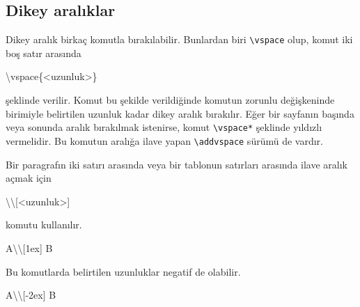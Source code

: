 \documentclass[
  10pt,
]{scrbook}
\newenvironment{Shaded}{\begin{snugshade}}{\end{snugshade}}
\newcommand{\FunctionTok}[1]{\textcolor[rgb]{0.00,0.00,0.00}{#1}}
\newcommand{\NormalTok}[1]{#1}
\theoremstyle{definition}
\theoremstyle{definition}
\theoremstyle{definition}
\theoremstyle{definition}
\theoremstyle{remark}
\begin{document}
\hypertarget{dikey-aralux131klar}{%
\subsection{Dikey aralıklar}\label{dikey-aralux131klar}}

Dikey aralık birkaç komutla bırakılabilir. Bunlardan biri \texttt{\textbackslash{}vspace} olup, komut iki boş satır arasında

\begin{Shaded}
\begin{Highlighting}[]
\FunctionTok{\textbackslash{}vspace}\NormalTok{\{\textless{}uzunluk\textgreater{}\}}
\end{Highlighting}
\end{Shaded}

şeklinde verilir. Komut bu şekilde verildiğinde komutun zorunlu değişkeninde birimiyle belirtilen uzunluk kadar dikey aralık bırakılır. Eğer bir sayfanın başında veya sonunda aralık bırakılmak istenirse, komut \texttt{\textbackslash{}vspace*} şeklinde yıldızlı vermelidir. Bu komutun aralığa ilave yapan \texttt{\textbackslash{}addvspace} sürümü de vardır.

Bir paragrafın iki satırı arasında veya bir tablonun satırları arasında ilave aralık açmak için

\begin{Shaded}
\begin{Highlighting}[]
\FunctionTok{\textbackslash{}\textbackslash{}}\NormalTok{[\textless{}uzunluk\textgreater{}]}
\end{Highlighting}
\end{Shaded}

komutu kullanılır.

\begin{Shaded}
\begin{Highlighting}[]
\NormalTok{A}\FunctionTok{\textbackslash{}\textbackslash{}}\NormalTok{[1ex]}
\NormalTok{B}
\end{Highlighting}
\end{Shaded}

Bu komutlarda belirtilen uzunluklar negatif de olabilir.

\begin{Shaded}
\begin{Highlighting}[]
\NormalTok{A}\FunctionTok{\textbackslash{}\textbackslash{}}\NormalTok{[{-}2ex]}
\NormalTok{B}
\end{Highlighting}
\end{Shaded}
\end{document}
